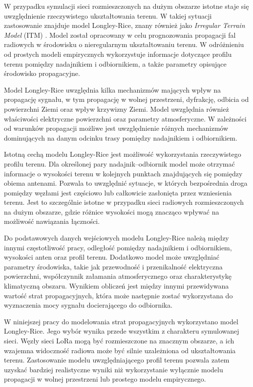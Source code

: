 \documentclass[12pt,a4paper,twoside]{report}
\theoremstyle{definition} %
\begin{document}
W przypadku symulacji sieci rozmieszczonych na dużym obszarze istotne staje się uwzględnienie rzeczywistego ukształtowania terenu. W takiej sytuacji zastosowanie znajduje model Longley-Rice, znany również jako \textit{Irregular Terrain Model} (ITM) \cite{longley1968}. Model został opracowany w celu prognozowania propagacji fal radiowych w środowisku o nieregularnym ukształtowaniu terenu. W odróżnieniu od prostych modeli empirycznych wykorzystuje informacje dotyczące profilu terenu pomiędzy nadajnikiem i odbiornikiem, a także parametry opisujące środowisko propagacyjne.

Model Longley-Rice uwzględnia kilka mechanizmów mających wpływ na propagację sygnału, w tym propagację w wolnej przestrzeni, dyfrakcję, odbicia od powierzchni Ziemi oraz wpływ krzywizny Ziemi. Model uwzględnia również właściwości elektryczne powierzchni oraz parametry atmosferyczne. W zależności od warunków propagacji możliwe jest uwzględnienie różnych mechanizmów dominujących na danym odcinku trasy pomiędzy nadajnikiem i odbiornikiem.

Istotną cechą modelu Longley-Rice jest możliwość wykorzystania rzeczywistego profilu terenu. Dla określonej pary nadajnik--odbiornik model może otrzymać informacje o wysokości terenu w kolejnych punktach znajdujących się pomiędzy obiema antenami. Pozwala to uwzględnić sytuacje, w których bezpośrednia droga pomiędzy węzłami jest częściowo lub całkowicie zasłonięta przez wzniesienia terenu. Jest to szczególnie istotne w przypadku sieci radiowych rozmieszczonych na dużym obszarze, gdzie różnice wysokości mogą znacząco wpływać na możliwość nawiązania łączności.

Do podstawowych danych wejściowych modelu Longley-Rice należą między innymi częstotliwość pracy, odległość pomiędzy nadajnikiem i odbiornikiem, wysokości anten oraz profil terenu. Dodatkowo model może uwzględniać parametry środowiska, takie jak przewodność i przenikalność elektryczna powierzchni, współczynnik załamania atmosferycznego oraz charakterystykę klimatyczną obszaru. Wynikiem obliczeń jest między innymi przewidywana wartość strat propagacyjnych, która może następnie zostać wykorzystana do wyznaczenia mocy sygnału docierającego do odbiornika.

W niniejszej pracy do modelowania strat propagacyjnych wykorzystano model Longley-Rice. Jego wybór wynika przede wszystkim z charakteru symulowanej sieci. Węzły sieci LoRa mogą być rozmieszczone na znacznym obszarze, a ich wzajemna widoczność radiowa może być silnie uzależniona od ukształtowania terenu. Zastosowanie modelu uwzględniającego profil terenu pozwala zatem uzyskać bardziej realistyczne wyniki niż wykorzystanie wyłącznie modelu propagacji w wolnej przestrzeni lub prostego modelu empirycznego.
\end{document}

